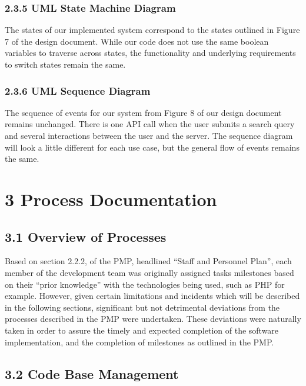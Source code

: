 \documentclass[]{article}
\begin{document}
\subsubsection{2.3.5 UML State Machine
Diagram}\label{uml-state-machine-diagram}

The states of our implemented system correspond to the states outlined
in Figure 7 of the design document. While our code does not use the same
boolean variables to traverse across states, the functionality and
underlying requirements to switch states remain the same.

\subsubsection{2.3.6 UML Sequence
Diagram}\label{uml-sequence-diagram}

The sequence of events for our system from Figure 8 of our design
document remains unchanged. There is one API call when the user submits
a search query and several interactions between the user and the server.
The sequence diagram will look a little different for each use case, but
the general flow of events remains the same.

\section{3 Process Documentation}\label{process-documentation}

\subsection{3.1 Overview of
Processes}\label{overview-of-processes}

Based on section 2.2.2, of the PMP, headlined ``Staff and Personnel
Plan'', each member of the development team was originally assigned
tasks milestones based on their ``prior knowledge'' with the
technologies being used, such as PHP for example. However, given certain
limitations and incidents which will be described in the following
sections, significant but not detrimental deviations from the processes
described in the PMP were undertaken. These deviations were naturally
taken in order to assure the timely and expected completion of the
software implementation, and the completion of milestones as outlined in
the PMP.

\subsection{3.2 Code Base
Management}\label{code-base-management}
\end{document}
